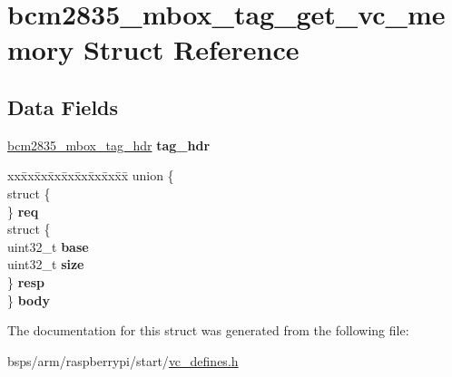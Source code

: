 \hypertarget{structbcm2835__mbox__tag__get__vc__memory}{}\section{bcm2835\+\_\+mbox\+\_\+tag\+\_\+get\+\_\+vc\+\_\+memory Struct Reference}
\label{structbcm2835__mbox__tag__get__vc__memory}
\subsection*{Data Fields}
\begin{DoxyCompactItemize}
\item 
\mbox{\label{structbcm2835__mbox__tag__get__vc__memory_a12670c5c8bc1e0051ee6229f941be70d}} 
\mbox{\hyperlink{structbcm2835__mbox__tag__hdr}{bcm2835\+\_\+mbox\+\_\+tag\+\_\+hdr}} {\bfseries tag\+\_\+hdr}
\item 
\mbox{\label{structbcm2835__mbox__tag__get__vc__memory_a9b0674b26503c4ddefdf39c30653ba5f}} 
\begin{tabbing}
xx\=xx\=xx\=xx\=xx\=xx\=xx\=xx\=xx\=\kill
union \{\\
\>struct \{\\
\>\} {\bfseries req}\\
\>struct \{\\
\>\>uint32\_t {\bfseries base}\\
\>\>uint32\_t {\bfseries size}\\
\>\} {\bfseries resp}\\
\} {\bfseries body}\\

\end{tabbing}\end{DoxyCompactItemize}


The documentation for this struct was generated from the following file\+:\begin{DoxyCompactItemize}
\item 
bsps/arm/raspberrypi/start/\mbox{\hyperlink{vc__defines_8h}{vc\+\_\+defines.\+h}}\end{DoxyCompactItemize}
